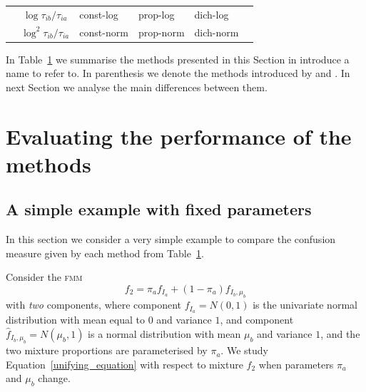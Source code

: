 \documentclass[10pt, a4paper]{article}
\newcommand{\fmm}{\textsc{fmm}\xspace}
\begin{document}
\begin{spacing}{1.9}
\begin{table}[htpb]
\begin{tabular}{c  c | >{\centering}m{0.7in} | >{\centering}m{0.8in} | >{\centering}m{0.7in} | m{0in}}
& $\log{\tau_{i b} / \tau_{i a}}$ & {\small const-log} & {\small prop-log}  & {\small dich-log}  &\\[5em] \cline{3-5}

& $\log^2{\tau_{i b} / \tau_{i a}}$ & {\small const-norm}  & {\small prop-norm} & {\small dich-norm}   &\\[5em] \cline{3-5}
\end{tabular}
\label{table_methods}
\end{table}

In Table~\ref{table_methods} we summarise the methods presented in this Section in introduce a name to refer to. In parenthesis we denote the methods introduced by \cite{baudry2010combining} and \cite{hennig2010methods}. In next Section we analyse the main differences between them.

\section{Evaluating the performance of the methods}
\label{comparison}

\subsection{A simple example with fixed parameters}


In this section we consider a very simple example to compare the confusion measure given by each method from Table~\ref{table_methods}.


Consider the \fmm
\begin{equation}\label{two_mixture}
f_2 = \pi_a f_{I_a} + (1 - \pi_a) f_{I_b, \mu_b}
\end{equation}
with \emph{two} components, where component $f_{I_a} = N(0, 1)$ is the univariate normal distribution with mean equal to $0$ and variance $1$, and component $\hat{f}_{I_b, \mu_b} = N(\mu_b, 1)$ is a normal distribution with mean $\mu_b$ and variance $1$, and the two mixture proportions are parameterised by $\pi_a$. We study Equation~\ref{unifying_equation} with respect to mixture $f_2$ when parameters $\pi_a$ and $\mu_b$ change. 


\end{spacing}
\end{document}
